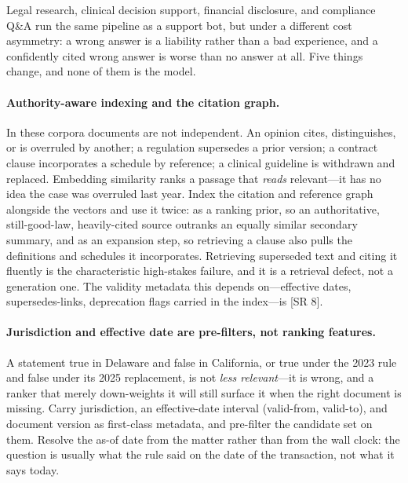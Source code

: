 Legal research, clinical decision support, financial disclosure, and
compliance Q\&A run the same pipeline as a support bot, but under a different
cost asymmetry: a wrong answer is a liability rather than a bad experience,
and a confidently cited wrong answer is worse than no answer at all.  Five
things change, and none of them is the model.

\paragraph{Authority-aware indexing and the citation graph.}
In these corpora documents are not independent.  An opinion cites,
distinguishes, or is overruled by another; a regulation supersedes a prior
version; a contract clause incorporates a schedule by reference; a clinical
guideline is withdrawn and replaced.  Embedding similarity ranks a passage
that \emph{reads} relevant---it has no idea the case was overruled last year.
Index the citation and reference graph alongside the vectors and use it twice:
as a ranking prior, so an authoritative, still-good-law, heavily-cited source
outranks an equally similar secondary summary, and as an expansion step, so
retrieving a clause also pulls the definitions and schedules it incorporates.
Retrieving superseded text and citing it fluently is the characteristic
high-stakes failure, and it is a retrieval defect, not a generation one.  The
validity metadata this depends on---effective dates, supersedes-links,
deprecation flags carried in the index---is [SR 8].

\paragraph{Jurisdiction and effective date are pre-filters, not ranking
features.}
A statement true in Delaware and false in California, or true under the 2023
rule and false under its 2025 replacement, is not \emph{less relevant}---it is
wrong, and a ranker that merely down-weights it will still surface it when the
right document is missing.  Carry jurisdiction, an effective-date interval
(valid-from, valid-to), and document version as first-class metadata, and
pre-filter the candidate set on them.  Resolve the as-of date from the matter
rather than from the wall clock: the question is usually what the rule said on
the date of the transaction, not what it says today.

